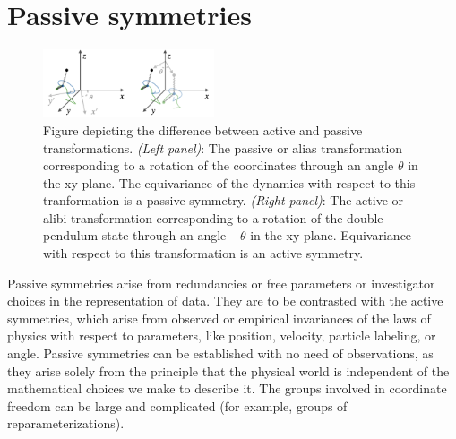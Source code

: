 \documentclass{article}
\theoremstyle{plain}
\theoremstyle{definition}
\theoremstyle{remark}
\begin{document}
\section{Passive symmetries}\label{sec:informal}

\begin{figure}
    \centering
    \includegraphics[width=0.45\textwidth]{alias.png}
    \vspace{-1.5ex}
    \caption{Figure depicting the difference between active and passive transformations. \textsl{(Left panel)}: The passive or alias transformation corresponding to a rotation of the coordinates through an angle $\theta$ in the xy-plane. The equivariance of the dynamics with respect to this tranformation is a passive symmetry. \textsl{(Right panel)}: The active or alibi transformation corresponding to a rotation of the double pendulum state through an angle $-\theta$ in the xy-plane. Equivariance with respect to this transformation is an active symmetry.}
    \vspace{-2.5ex}
    \label{fig:alias}
\end{figure}

Passive symmetries arise from redundancies or free parameters or investigator choices in the representation of data.
They are to be contrasted with the active symmetries, which arise from observed or empirical invariances of the laws of physics with respect to parameters, like position, velocity, particle labeling, or angle.
Passive symmetries can be established with no need of observations, as they arise solely from the principle that the physical world is independent of the mathematical choices we make to describe it.
The groups involved in coordinate freedom can be large and complicated (for example, groups of reparameterizations).
\end{document}

